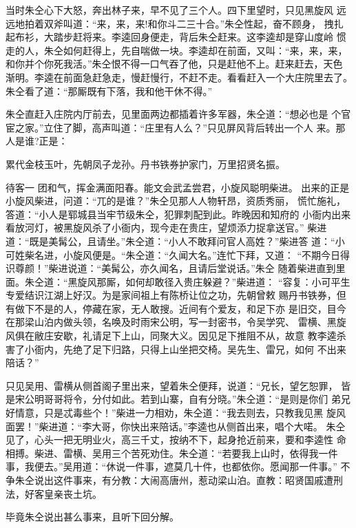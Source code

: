 当时朱仝心下大怒，奔出林子来，早不见了三个人。四下里望时，只见黑旋风
远远地拍着双斧叫道：“来，来，来!和你斗二三十合。”朱仝性起，奋不顾身，
拽扎起布衫，大踏步赶将来。李逵回身便走，背后朱仝赶来。这李逵却是穿山度岭
惯走的人，朱仝如何赶得上，先自喘做一块。李逵却在前面，又叫：“来，来，来，
和你并个你死我活。”朱仝恨不得一口气吞了他，只是赶他不上。赶来赶去，天色
渐明。李逵在前面急赶急走，慢赶慢行，不赶不走。看看赶入一个大庄院里去了。
朱仝看了道：“那厮既有下落，我和他干休不得。”

朱仝直赶入庄院内厅前去，见里面两边都插着许多军器，朱仝道：“想必也是
个官宦之家。”立住了脚，高声叫道：“庄里有人么？”只见屏风背后转出一个人
来。那人是谁?正是：

累代金枝玉叶，先朝凤子龙孙。丹书铁券护家门，万里招贤名振。

待客一
团和气，挥金满面阳春。能文会武孟尝君，小旋风聪明柴进。
出来的正是小旋风柴进，问道：“兀的是谁？”朱仝见那人人物轩昂，资质秀丽，
慌忙施礼，答道：“小人是郓城县当牢节级朱仝，犯罪刺配到此。昨晚因和知府的
小衙内出来看放河灯，被黑旋风杀了小衙内，现今走在贵庄，望烦添力捉拿送官。”
柴进道：“既是美髯公，且请坐。”朱仝道：“小人不敢拜问官人高姓？”柴进答
道：“小可姓柴名进，小旋风便是。“朱仝道：“久闻大名。”连忙下拜，又道：
“不期今日得识尊颜！”柴进说道：“美髯公，亦久闻名，且请后堂说话。”朱仝
随着柴进直到里面。朱仝道：“黑旋风那厮，如何却敢径入贵庄躲避？”柴进道：
“容复：小可平生专爱结识江湖上好汉。为是家间祖上有陈桥让位之功，先朝曾敕
赐丹书铁券，但有做下不是的人，停藏在家，无人敢搜。近间有个爱友，和足下亦
是旧交，目今在那梁山泊内做头领，名唤及时雨宋公明，写一封密书，令吴学究、
雷横、黑旋风俱在敝庄安歇，礼请足下上山，同聚大义。因见足下推阻不从，故意
教李逵杀害了小衙内，先绝了足下归路，只得上山坐把交椅。吴先生、雷兄，如何
不出来陪话？”

只见吴用、雷横从侧首阁子里出来，望着朱仝便拜，说道：“兄长，望乞恕罪，
皆是宋公明哥哥将令，分付如此。若到山寨，自有分晓。”朱仝道：“是则是你们
弟兄好情意，只是忒毒些个！”柴进一力相劝，朱仝道：“我去则去，只教我见黑
旋风面罢！”柴进道：“李大哥，你快出来陪话。”李逵也从侧首出来，唱个大喏。
朱仝见了，心头一把无明业火，高三千丈，按纳不下，起身抢近前来，要和李逵性
命相搏。柴进、雷横、吴用三个苦死劝住。朱仝道：“若要我上山时，依得我一件
事，我便去。”吴用道：“休说一件事，遮莫几十件，也都依你。愿闻那一件事。”
不争朱仝说出这件事来，有分教：大闹高唐州，惹动梁山泊。直教：昭贤国戚遭刑
法，好客皇亲丧土坑。

毕竟朱仝说出甚么事来，且听下回分解。